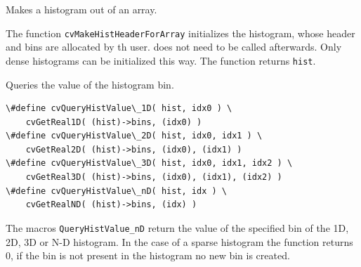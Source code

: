Makes a histogram out of an array.


\begin{description}
\end{description}

The function \texttt{cvMakeHistHeaderForArray} initializes the histogram, whose header and bins are allocated by th user.  does not need to be called afterwards. Only dense histograms can be initialized this way. The function returns \texttt{hist}.

\label{QueryHistValue_nD}

Queries the value of the histogram bin.

\begin{lstlisting}
\#define cvQueryHistValue\_1D( hist, idx0 ) \
    cvGetReal1D( (hist)->bins, (idx0) )
\#define cvQueryHistValue\_2D( hist, idx0, idx1 ) \
    cvGetReal2D( (hist)->bins, (idx0), (idx1) )
\#define cvQueryHistValue\_3D( hist, idx0, idx1, idx2 ) \
    cvGetReal3D( (hist)->bins, (idx0), (idx1), (idx2) )
\#define cvQueryHistValue\_nD( hist, idx ) \
    cvGetRealND( (hist)->bins, (idx) )
\end{lstlisting}

\begin{description}
\cvarg{hist}{Histogram}
\end{description}

The macros \texttt{QueryHistValue\_nD} return the value of the specified bin of the 1D, 2D, 3D or N-D histogram. In the case of a sparse histogram the function returns 0, if the bin is not present in the histogram no new bin is created.

